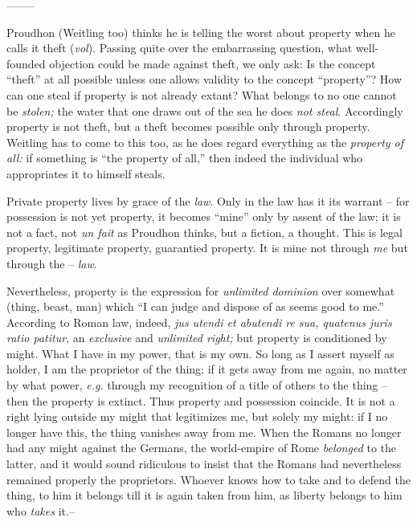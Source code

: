 \begin{center}
--------\end{center}


Proudhon (Weitling too) thinks he is telling the worst about property when he 
calls it theft (\textit{vol}). Passing quite over the embarrassing question, 
what well-founded objection could be made against theft, we only ask: Is the 
concept ``theft'' at all possible unless one allows validity to the concept 
``property''? How can one steal if property is not already extant? What 
belongs to no one cannot be \textit{stolen;} the water that one draws out of 
the sea he does \textit{not steal}. Accordingly property is not theft, but a 
theft becomes possible only through property. Weitling has to come to this 
too, as he does regard everything as the \textit{property of all:} if 
something is ``the property of all,'' then indeed the individual who 
appropriates it to himself steals.

Private property lives by grace of the \textit{law}. Only in the law has it 
its warrant -- for possession is not yet property, it becomes ``mine'' only 
by assent of the law; it is not a fact, not \textit{un fait} as Proudhon 
thinks, but a fiction, a thought. This is legal property, legitimate property, 
guarantied property. It is mine not through \textit{me} but through the -- 
\textit{law}.

Nevertheless, property is the expression for \textit{unlimited dominion} over 
somewhat (thing, beast, man) which ``I can judge and dispose of as seems good 
to me.'' According to Roman law, indeed, \textit{jus utendi et abutendi re 
sua, quatenus juris ratio patitur}, an \textit{exclusive} and 
\textit{unlimited right;} but property is conditioned by might. What I have in 
my power, that is my own. So long as I assert myself as holder, I am the 
proprietor of the thing; if it gets away from me again, no matter by what 
power, \textit{e.g.} through my recognition of a title of others to the thing 
-- then the property is extinct. Thus property and possession coincide. It is 
not a right lying outside my might that legitimizes me, but solely my might: 
if I no longer have this, the thing vanishes away from me. When the Romans no 
longer had any might against the Germans, the world-empire of Rome 
\textit{belonged} to the latter, and it would sound ridiculous to insist that 
the Romans had nevertheless remained properly the proprietors. Whoever knows 
how to take and to defend the thing, to him it belongs till it is again taken 
from him, as liberty belongs to him who \textit{takes} it.--

